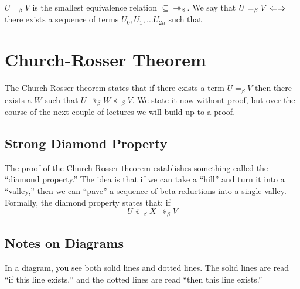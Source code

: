$U =_\beta V$ is the smallest equivalence relation $\subseteq \twoheadrightarrow_\beta$. We say that $U =_\beta V \Leftarrow\Rightarrow$ there exists a sequence of terms $U_0, U_1,\ldots U_{2n}$ such that
\begin{center}
\end{center}

\section{Church-Rosser Theorem}
The Church-Rosser theorem states that if there exists a term $U =_\beta V$ then there exists a $W$ such that $U \twoheadrightarrow_\beta W \twoheadleftarrow_\beta V$. We state it now without proof, but over the course of the next couple of lectures we will build up to a proof.\\

\subsection{Strong Diamond Property}
The proof of the Church-Rosser theorem establishes something called the ``diamond property.'' The idea is that if we can take a ``hill'' and turn it into a ``valley,'' then we can ``pave'' a sequence of beta reductions into a single valley. Formally, the diamond property states that: if
\begin{equation*}
  U \twoheadleftarrow_\beta X \twoheadrightarrow_\beta V
\end{equation*}
 
\subsection{Notes on Diagrams}
In a diagram, you see both solid lines and dotted lines. The solid lines are read ``if this line exists,'' and the dotted lines are read ``then this line exists.''
\begin{center}
\end{center}

